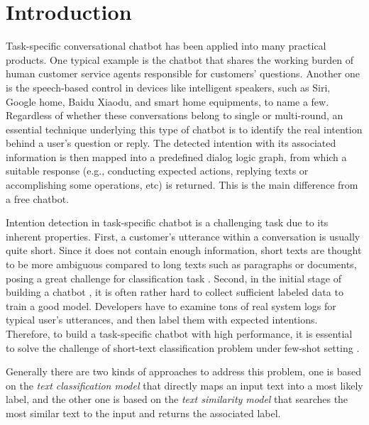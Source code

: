 \section{Introduction}
\label{sec:intro}

Task-specific  conversational  chatbot  \cite{wen2016network}  has been applied
into  many practical products. One typical example is the chatbot that shares the working burden of
human  customer  service  agents  responsible  for  customers' questions. 
Another one is the speech-based control in
devices  like  intelligent  speakers, such as Siri, Google home, Baidu Xiaodu,
and smart home equipments, to name a few. Regardless of whether these conversations belong to
single or  multi-round, an essential technique underlying this type of chatbot is to
identify  the  real  intention  behind  a  user's  question or reply. 
The detected intention  with  its  associated  information  is then mapped into a
predefined dialog logic graph, from which a suitable response (e.g., conducting 
expected actions, replying texts or accomplishing some operations, etc)  is returned.
This  is  the  main  difference  from  a  free chatbot.  

Intention detection in task-specific chatbot  is  a  challenging task due to its inherent properties. First,
a customer's  utterance  within  a conversation is usually quite short. Since it
does  not  contain  enough  information,  short  texts \cite{song2014short} are
thought  to  be  more  ambiguous  compared to long texts such as paragraphs or
documents,  posing  a  great challenge \cite{chen2019deep} for classification
task   \cite{phan2008learning,yan2009dynamic,hua2015short}.   Second,  in  the
initial  stage  of  building  a  chatbot , it is often rather hard to collect
sufficient  labeled  data  to  train  a good model. Developers have to
examine tons of real system logs for typical user's utterances, and then label
them  with expected intentions. Therefore, to build a task-specific chatbot with
high  performance, it is essential to solve the challenge of short-text
classification   \cite{sriram2010short}   problem   under   few-shot   setting
\cite{yu2018diverse}.


Generally  there  are  two  kinds  of  approaches  to  address  this  problem,
one is based on the \emph{text classification model} that directly maps an input text into a most likely label, and
the other one is based on the \emph{text similarity  model}  that searches the most similar text to the input and returns the associated label.


